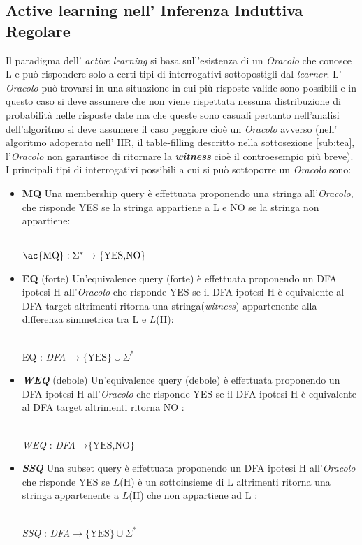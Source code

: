 \subsection{Active learning nell' Inferenza Induttiva Regolare}
Il paradigma dell' \textit{active learning} si basa sull'esistenza di un \textit{Oracolo} che conosce \ac{L} e può rispondere solo a certi tipi di interrogativi sottopostigli dal \textit{learner}. L' \textit{Oracolo} può trovarsi in una situazione in cui più risposte valide sono possibili e in questo caso si deve assumere che non viene rispettata nessuna distribuzione di probabilità nelle risposte date ma che queste sono casuali pertanto nell'analisi dell'algoritmo si deve assumere il caso peggiore cioè un \textit{Oracolo} avverso (nell' algoritmo adoperato nell' \ac{IIR}, il table-filling descritto nella sottosezione \ref{sub:tea}, l'\textit{Oracolo} non garantisce di ritornare la \textit{\textbf{witness}} cioè il controesempio più breve).
I principali tipi di interrogativi possibili a cui si può sottoporre un \textit{Oracolo} sono:
\begin{itemize}
\item \textbf{\ac{MQ}} Una membership query è effettuata proponendo una stringa all'\textit{Oracolo}, che risponde YES se la stringa appartiene a \ac{L} e NO se la stringa non appartiene:\\\\
\centerline{$\text{\ac{MQ}} : \Sigma^{*}  \to \text{\{YES,NO\}}$}

\item \textbf{\ac{EQ}} (forte) Un'equivalence query (forte) è effettuata proponendo un \ac{DFA} ipotesi \ac{H} all'\textit{Oracolo} che risponde YES se il DFA ipotesi \ac{H} è equivalente al \ac{DFA} target altrimenti ritorna una stringa(\textit{witness}) appartenente alla differenza simmetrica tra \ac{L} e $L$(\ac{H}):\\\\
\centerline{\ac{EQ} : \textit{DFA}$ \,\to \text{\{YES\}} \cup \Sigma^{*}$}

\item \textit{\textbf{WEQ}} (debole) Un'equivalence query (debole) è effettuata proponendo un \ac{DFA} ipotesi \ac{H} all'\textit{Oracolo} che risponde YES se il DFA ipotesi \ac{H} è equivalente al DFA target altrimenti ritorna NO :\\\\
\centerline{\textit{WEQ} : \textit{DFA}$ \to  \text{\{YES,NO\}}$}

\item \textit{\textbf{SSQ}} Una subset query è effettuata proponendo un DFA ipotesi \ac{H} all'\textit{Oracolo} che risponde YES se $L$(\ac{H}) è un sottoinsieme di \ac{L} altrimenti ritorna una stringa appartenente a $L$(\ac{H}) che non appartiene ad \ac{L} :\\\\
\centerline{\textit{SSQ} : \textit{DFA}$ \to \text{\{YES\}} \cup \Sigma^{*}$}
\end{itemize}



